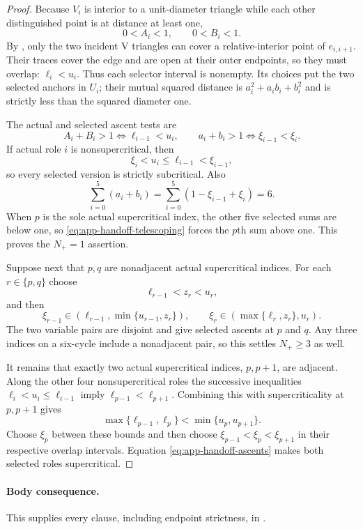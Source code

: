 \begin{proof}
Because $V_i$ is interior to a unit-diameter triangle while each other
distinguished point is at distance at least one,
\[
 0<A_i<1,
 \qquad
 0<B_i<1.
\]
By , only the two incident V
triangles can cover a relative-interior point of $e_{i,i+1}$.  Their traces
cover the edge and are open at their outer endpoints, so they must overlap:
$\ell_i<u_i$.  Thus each selector interval is nonempty.  Its choices put the
two selected anchors in $U_i$; their mutual squared distance is
$a_i^2+a_ib_i+b_i^2$ and is strictly less than the squared diameter one.

The actual and selected ascent tests are
\begin{equation}
 A_i+B_i>1\iff\ell_{i-1}<u_i,
 \qquad
 a_i+b_i>1\iff\xi_{i-1}<\xi_i.
 \label{eq:app-handoff-ascents}
\end{equation}
If actual role $i$ is nonsupercritical, then
\[
 \xi_i<u_i\le\ell_{i-1}<\xi_{i-1},
\]
so every selected version is strictly subcritical.  Also
\begin{equation}
 \sum_{i=0}^5(a_i+b_i)
 =\sum_{i=0}^5(1-\xi_{i-1}+\xi_i)=6.
 \label{eq:app-handoff-telescoping}
\end{equation}
When $p$ is the sole actual supercritical index, the other five selected
sums are below one, so \eqref{eq:app-handoff-telescoping} forces the $p$th
sum above one.  This proves the $N_+=1$ assertion.

Suppose next that $p,q$ are nonadjacent actual supercritical indices.  For
each $r\in\{p,q\}$ choose
\[
 \ell_{r-1}<z_r<u_r,
\]
and then
\[
 \xi_{r-1}\in(\ell_{r-1},\min\{u_{r-1},z_r\}),
 \qquad
 \xi_r\in(\max\{\ell_r,z_r\},u_r).
\]
The two variable pairs are disjoint and give selected ascents at $p$ and
$q$.  Any three indices on a six-cycle include a nonadjacent pair, so this
settles $N_+\ge3$ as well.

It remains that exactly two actual supercritical indices, $p,p+1$, are
adjacent.  Along the other four nonsupercritical roles the successive
inequalities $\ell_i<u_i\le\ell_{i-1}$ imply
$\ell_{p-1}<\ell_{p+1}$.  Combining this with supercriticality at $p,p+1$
gives
\[
 \max\{\ell_{p-1},\ell_p\}<\min\{u_p,u_{p+1}\}.
\]
Choose $\xi_p$ between these bounds and then choose
$\xi_{p-1}<\xi_p<\xi_{p+1}$ in their respective overlap intervals.
Equation \eqref{eq:app-handoff-ascents} makes both selected roles
supercritical.
\end{proof}

\paragraph{Body consequence.}
This supplies every clause, including endpoint strictness, in
.
